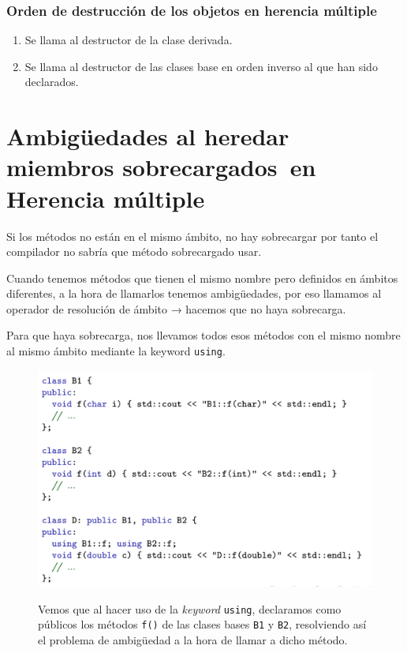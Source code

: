 \subsubsection{Orden de destrucción de los objetos en herencia múltiple}
\begin{enumerate}
	\item Se llama al destructor de la clase derivada.
	\item Se llama al destructor de las clases base en orden inverso al que han sido declarados.
\end{enumerate}
\newpage
\section{Ambigüedades al heredar miembros sobrecargados\ en Herencia múltiple}
Si los métodos no están en el mismo ámbito, no hay sobrecargar por tanto el compilador no sabría que método sobrecargado usar.

Cuando tenemos métodos que tienen el mismo nombre pero definidos en ámbitos diferentes, a la hora de llamarlos tenemos ambigüedades, por eso llamamos al operador de resolución de ámbito → hacemos que no haya sobrecarga.

Para que haya sobrecarga, nos llevamos todos esos métodos con el mismo nombre al mismo ámbito mediante la keyword \texttt{using}.

\begin{figure}[h]
	\begin{center}
	\includegraphics[width=\textwidth]{Imagenes/gen8.png}
\end{center}
Vemos que al hacer uso de la \textit{keyword} \texttt{using}, declaramos como públicos los 
métodos \texttt{f()} de las clases bases \texttt{B1} y \texttt{B2}, resolviendo así el 
problema de ambigüedad a la hora de llamar a dicho método.
\end{figure}

